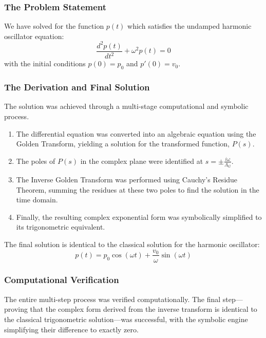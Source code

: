 \subsubsection*{The Problem Statement}
We have solved for the function $p(t)$ which satisfies the undamped harmonic oscillator equation:
$$ \frac{d^2p(t)}{dt^2} + \omega^2 p(t) = 0 $$
with the initial conditions $p(0) = p_0$ and $p'(0) = v_0$.

\subsubsection*{The Derivation and Final Solution}
The solution was achieved through a multi-stage computational and symbolic process.
\begin{enumerate}
    \item The differential equation was converted into an algebraic equation using the Golden Transform, yielding a solution for the transformed function, $P(s)$.
    \item The poles of $P(s)$ in the complex plane were identified at $s = \pm \frac{i\omega}{\Lambda_G}$.
    \item The Inverse Golden Transform was performed using Cauchy's Residue Theorem, summing the residues at these two poles to find the solution in the time domain.
    \item Finally, the resulting complex exponential form was symbolically simplified to its trigonometric equivalent.
\end{enumerate}
The final solution is identical to the classical solution for the harmonic oscillator:
$$ p(t) = p_0 \cos(\omega t) + \frac{v_0}{\omega}\sin(\omega t) $$

\subsubsection*{Computational Verification}
The entire multi-step process was verified computationally. The final step—proving that the complex form derived from the inverse transform is identical to the classical trigonometric solution—was successful, with the symbolic engine simplifying their difference to exactly zero.

